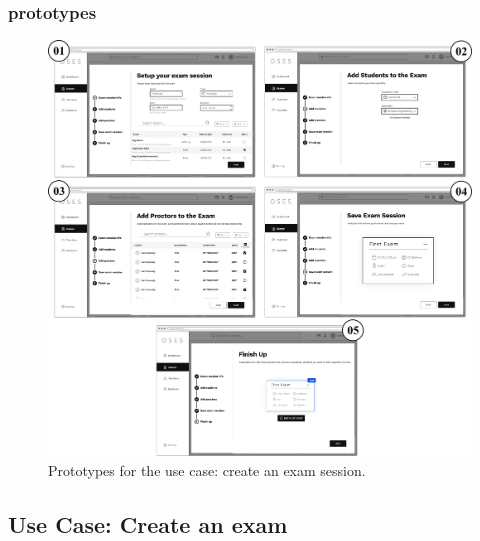 \documentclass[]{uc2pfecaneva}
\begin{document}
    \subsubsection{prototypes}
    \begin{figure}[h]

        \centering
        \includegraphics[width=\textwidth]{images/prototypes_create_exam_session}

        \caption{Prototypes for the use case: create an exam session.}
    \end{figure}
    \clearpage








    \raggedright\subsection{Use Case: Create an exam}
\end{document}

